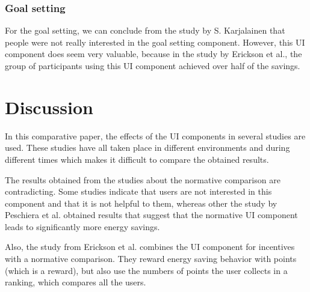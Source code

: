 \documentclass[journal]{vgtc}                %
\begin{document}
\subsubsection{Goal setting}
For the goal setting, we can conclude from the study by S. Karjalainen that people were not really interested in the goal setting component. However, this UI component does seem very valuable, because in the study by Erickson et al., the group of participants using this UI component achieved over half of the savings.


\section{Discussion}
In this comparative paper, the effects of the UI components in several studies are used. These studies have all taken place in different environments and during different times which makes it difficult to compare the obtained results.

The results obtained from the studies about the normative comparison are contradicting. Some studies indicate that users are not interested in this component and that it is not helpful to them, whereas other the study by Peschiera et al. obtained results that suggest that the normative UI component leads to significantly more energy savings.

Also, the study from Erickson et al. combines the UI component for incentives with a normative comparison. They reward energy saving behavior with points (which is a reward), but also use the numbers of points the user collects in a ranking, which compares all the users.\\


\end{document}
